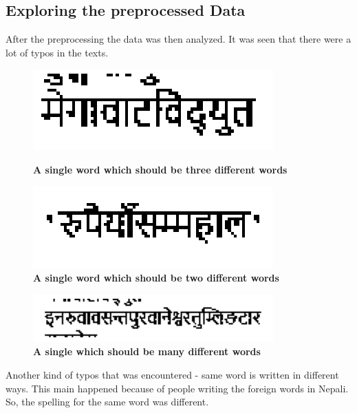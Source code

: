 \documentclass[12pt]{report}
\begin{document}
            \subsection{Exploring the preprocessed Data}
            After the preprocessing the data was then analyzed. It was seen that there were a lot of typos in the texts.
            \begin{figure}[!htb]
                \begin{minipage}{0.48\textwidth}
                  \centering
                  \includegraphics[width=.7\linewidth]{typo11.png}
                  \caption{\textbf{A single word which should be three different words}}\label{Fig:typo1}
                \end{minipage}\hfill
                \begin{minipage}{0.48\textwidth}
                  \centering
                  \includegraphics[width=.7\linewidth]{typo22.png}
                  \caption{\textbf{A single word which should be two different words}}\label{Fig:typo2}
                \end{minipage}
             \end{figure}

             \begin{figure}[h]
                 \centering
                 \includegraphics[width=.7\linewidth]{typo33.png}
                 \caption{\textbf{A single which should be many different words}}\label{Fig:typo3}
             \end{figure}

            Another kind of typos that was encountered - same word is written in different ways. This main happened
            because of people writing the foreign words in Nepali. So, the spelling for the same word was different.
\end{document}
